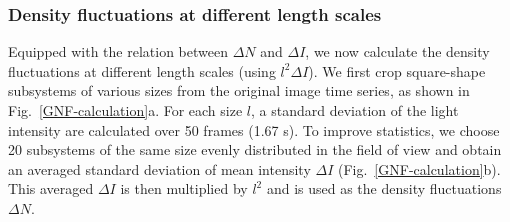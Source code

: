 \documentclass[twocolumn,aps,prx,amsmath,amssymb,longbibliography]{revtex4-2}
\begin{document}
\subsubsection{Density fluctuations at different length scales}

Equipped with the relation between $\Delta N$ and $\Delta I$, we now calculate the density fluctuations at different length scales (using $l^2\Delta I$). We first crop square-shape subsystems of various sizes from the original image time series, as shown in Fig.~\ref{GNF-calculation}a. For each size $l$, a standard deviation of the light intensity are calculated over 50 frames (1.67 s). To improve statistics, we choose 20 subsystems of the same size evenly distributed in the field of view and obtain an averaged standard deviation of mean intensity $\Delta I$ (Fig.~\ref{GNF-calculation}b). This averaged $\Delta I$ is then multiplied by $l^2$ and is used as the density fluctuations $\Delta N$.

\end{document}
